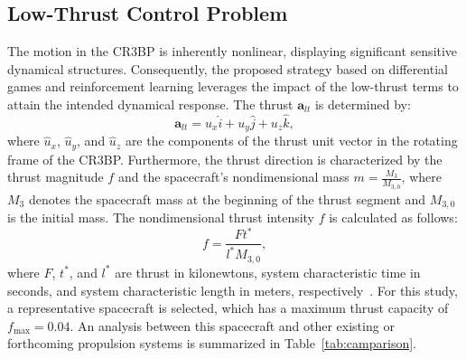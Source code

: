 \documentclass[conference]{IEEEtran}
\begin{document}
\subsection{Low-Thrust Control Problem}
The motion in the CR3BP is inherently nonlinear, displaying significant sensitive dynamical structures. Consequently, the proposed strategy based on differential games and reinforcement learning leverages the impact of the low-thrust terms to attain the intended dynamical response. The thrust \(\mathbf{a}_{lt}\) is determined by:
\begin{equation}
\mathbf{a}_{lt} =  {u}_x \hat{i} + {u}_y \hat{j} + {u}_z \hat{k},
\end{equation}
where \( \hat{u}_x \), \( \hat{u}_y \), and \( \hat{u}_z \) are the components of the thrust unit vector in the rotating frame of the CR3BP. Furthermore, the thrust direction is characterized by the thrust magnitude \( f \) and the spacecraft's nondimensional mass \( m = \frac{M_3}{M_{3,0}} \), where \( M_3 \) denotes the spacecraft mass at the beginning of the thrust segment and \( M_{3,0} \) is the initial mass.
The nondimensional thrust intensity \( f \) is calculated as follows:
\begin{equation}
f = \dfrac{Ft^*}{l^* M_{3,0}},	
\end{equation}
where \( F \), \(t^*\), and \(l^*\) are thrust in kilonewtons, system characteristic time in seconds, and system characteristic length in meters, respectively~\cite{lafarge}. 
For this study, a representative spacecraft is selected, which has a maximum thrust capacity of \( f_{\text{max}} = 0.04 \). An analysis between this spacecraft and other existing or forthcoming propulsion systems is summarized in Table~\ref{tab:camparison}.
\end{document}
